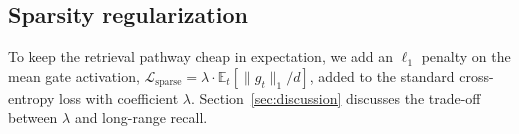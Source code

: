 \subsection{Sparsity regularization}

To keep the retrieval pathway cheap in expectation, we add an $\ell_1$
penalty on the mean gate activation, $\mathcal{L}_{\text{sparse}} =
\lambda \cdot \mathbb{E}_t[\|g_t\|_1 / d]$, added to the standard
cross-entropy loss with coefficient $\lambda$. Section~\ref{sec:discussion}
discusses the trade-off between $\lambda$ and long-range recall.
